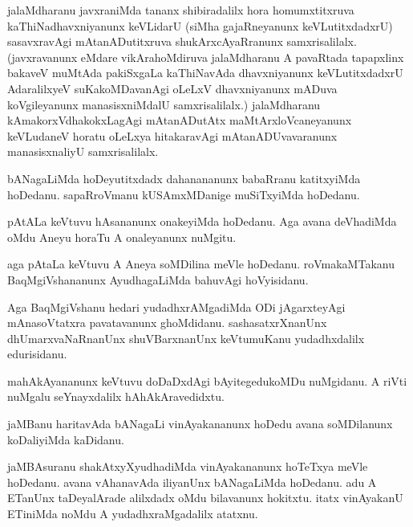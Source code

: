 \documentclass{article}
\begin{document}
\begin{mn}%
jalaMdharanu javxraniMda tananx shibiradalilx hora homumxtitxruva kaThiNadhavxniyanunx 
keVLidarU (siMha gajaRneyanunx keVLutitxdadxrU) sasavxravAgi mAtanADutitxruva 
shukArxcAyaRranunx samxrisalilalx.(javxravanunx eMdare vikArahoMdiruva jalaMdharanu A 
pavaRtada tapapxlinx bakaveV muMtAda pakiSxgaLa kaThiNavAda dhavxniyanunx keVLutitxdadxrU 
AdaralilxyeV suKakoMDavanAgi oLeLxV dhavxniyanunx mADuva koVgileyanunx manasisxniMdalU 
samxrisalilalx.) jalaMdharanu kAmakorxVdhakokxLagAgi mAtanADutAtx maMtArxloVcaneyanunx 
keVLudaneV  horatu oLeLxya hitakaravAgi mAtanADUvavaranunx manasisxnaliyU samxrisalilalx.
\end{mn}

\begin{mn}%
bANagaLiMda hoDeyutitxdadx dahanananunx babaRranu katitxyiMda hoDedanu. sapaRroVmanu 
kUSAmxMDanige muSiTxyiMda hoDedanu.
\end{mn}

\begin{mn}%
pAtALa keVtuvu hAsananunx onakeyiMda hoDedanu. Aga avana deVhadiMda oMdu Aneyu horaTu A 
onaleyanunx nuMgitu.
\end{mn}

\begin{mn}%
aga pAtaLa keVtuvu A Aneya soMDilina meVle hoDedanu. roVmakaMTakanu BaqMgiVshananunx 
AyudhagaLiMda bahuvAgi hoVyisidanu.
\end{mn}

\begin{mn}%
Aga BaqMgiVshanu hedari yudadhxrAMgadiMda ODi jAgarxteyAgi mAnasoVtatxra pavatavanunx 
ghoMdidanu. sashasatxrXnanUnx dhUmarxvaNaRnanUnx shuVBarxnanUnx keVtumuKanu yudadhxdalilx 
edurisidanu.
\end{mn}

\begin{mn}%
mahAkAyananunx keVtuvu doDaDxdAgi bAyitegedukoMDu nuMgidanu. A riVti nuMgalu seYnayxdalilx 
hAhAkAravedidxtu.
\end{mn}

\begin{mn}%
jaMBanu haritavAda bANagaLi vinAyakananunx hoDedu avana soMDilanunx koDaliyiMda kaDidanu.
\end{mn}

\begin{mn}%
jaMBAsuranu shakAtxyXyudhadiMda vinAyakananunx hoTeTxya meVle hoDedanu. avana vAhanavAda 
iliyanUnx bANagaLiMda hoDedanu. adu A ETanUnx taDeyalArade alilxdadx oMdu bilavanunx 
hokitxtu. itatx vinAyakanU ETiniMda noMdu A yudadhxraMgadalilx atatxnu.
\end{mn}
\end{document}
